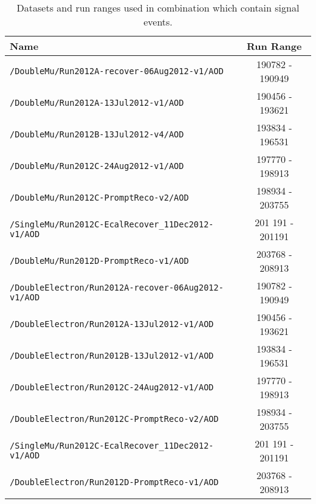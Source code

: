 \begin{table}[hbt]
\caption{\label{tab:DilDsets_run}Datasets and run ranges used in combination which contain signal events.}
\begin{center}
\begin{tabular}{lc}\hline\hline
Name		& Run Range  \\ \hline
\verb=/DoubleMu/Run2012A-recover-06Aug2012-v1/AOD=                 & 190782 - 190949 \\ 
\verb=/DoubleMu/Run2012A-13Jul2012-v1/AOD=                                  &  190456 - 193621                     \\ 
\verb=/DoubleMu/Run2012B-13Jul2012-v4/AOD=                                  &  193834 - 196531                     \\ 
\verb=/DoubleMu/Run2012C-24Aug2012-v1/AOD=                                &  197770 - 198913  \\  
\verb=/DoubleMu/Run2012C-PromptReco-v2/AOD=                               &  198934 - 203755                     \\ 
\verb=/SingleMu/Run2012C-EcalRecover_11Dec2012-v1/AOD=          & 201 191 - 201191 \\
\verb=/DoubleMu/Run2012D-PromptReco-v1/AOD=                               &  203768 - 208913   \\

\verb=/DoubleElectron/Run2012A-recover-06Aug2012-v1/AOD=         &    190782 - 190949                   \\ 
\verb=/DoubleElectron/Run2012A-13Jul2012-v1/AOD=                         & 190456 - 193621                       \\ 
\verb=/DoubleElectron/Run2012B-13Jul2012-v1/AOD=                         &  193834 - 196531  \\ 
\verb=/DoubleElectron/Run2012C-24Aug2012-v1/AOD=                       &  197770 - 198913                    \\ 
\verb=/DoubleElectron/Run2012C-PromptReco-v2/AOD=                     &   198934 - 203755                  \\ 
\verb=/SingleMu/Run2012C-EcalRecover_11Dec2012-v1/AOD=          & 201 191 - 201191 \\
\verb=/DoubleElectron/Run2012D-PromptReco-v1/AOD=                      &  203768 - 208913   \\


\end{tabular}
\end{center}
\end{table}
